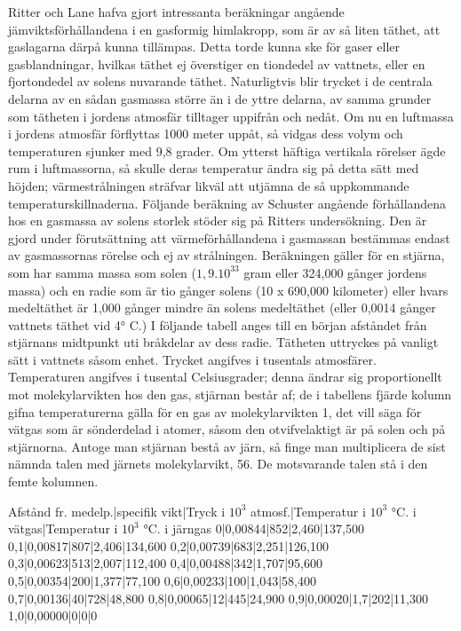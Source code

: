 \documentclass[a4paper, 12pt, oneside, swedish]{article}
\begin{document}
Ritter och Lane hafva gjort intressanta beräkningar angående jämviktsförhållandena i en gasformig himlakropp, som är av så liten täthet, att gaslagarna därpå kunna tillämpas. Detta torde kunna ske för gaser eller gasblandningar, hvilkas täthet ej överstiger en tiondedel av vattnets, eller en fjortondedel av solens nuvarande täthet. Naturligtvis blir trycket i de centrala delarna av en sådan gasmassa större än i de yttre delarna, av samma grunder som tätheten i jordens atmosfär tilltager uppifrån och nedåt. Om nu en luftmassa i jordens atmosfär förflyttas 1000 meter uppåt, så vidgas dess volym och temperaturen sjunker med 9,8 grader. Om ytterst häftiga vertikala rörelser ägde rum i luftmassorna, så skulle deras temperatur ändra sig på detta sätt med höjden; värmestrålningen sträfvar likväl att utjämna de så uppkommande temperaturskillnaderna. Följande beräkning av Schuster angående förhållandena hos en gasmassa av solens storlek stöder sig på Ritters undersökning. Den är gjord under förutsättning att värmeförhållandena i gasmassan bestämmas endast av gasmassornas rörelse och ej av strålningen. Beräkningen gäller för en stjärna, som har samma massa som solen ($1,9.10^{33}$ gram eller 324,000 gånger jordens massa) och en radie som är tio gånger solens (10 x 690,000 kilometer) eller hvars medeltäthet är 1,000 gånger mindre än solens medeltäthet (eller 0,0014 gånger vattnets täthet vid 4° C.) I följande tabell anges till en början afståndet från stjärnans midtpunkt uti bråkdelar av dess radie. Tätheten uttryckes på vanligt sätt i vattnets såsom enhet. Trycket angifves i tusentals atmosfärer. Temperaturen angifves i tusental Celsiusgrader; denna ändrar sig proportionellt mot molekylarvikten hos den gas, stjärnan består af; de i tabellens fjärde kolumn gifna temperaturerna gälla för en gas av molekylarvikten 1, det vill säga för vätgas som är sönderdelad i atomer, såsom den otvifvelaktigt är på solen och på stjärnorna. Antoge man stjärnan bestå av järn, så finge man multiplicera de sist nämnda talen med järnets molekylarvikt, 56. De motsvarande talen stå i den femte kolumnen.

Afstånd fr. medelp.|specifik vikt|Tryck i $10^{3}$ atmosf.|Temperatur i $10^{3}$ °C. i vätgas|Temperatur i $10^{3}$ °C. i järngas  
0|0,00844|852|2,460|137,500  
0,1|0,00817|807|2,406|134,600  
0,2|0,00739|683|2,251|126,100  
0,3|0,00623|513|2,007|112,400  
0,4|0,00488|342|1,707|95,600  
0,5|0,00354|200|1,377|77,100  
0,6|0,00233|100|1,043|58,400  
0,7|0,00136|40|728|48,800  
0,8|0,00065|12|445|24,900  
0,9|0,00020|1,7|202|11,300  
1,0|0,00000|0|0|0  
\end{document}
